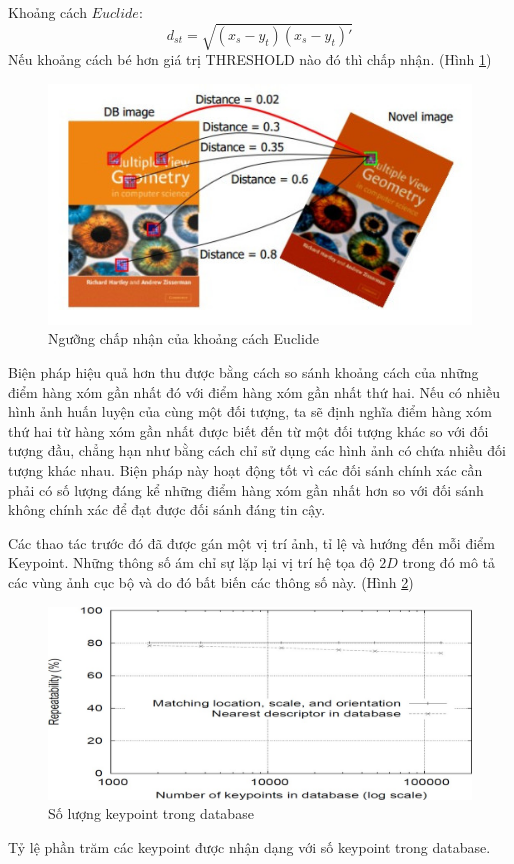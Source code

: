 \documentclass[conference]{IEEEtran}
\begin{document}
Khoảng cách $Euclide$:
\begin{equation}
d_{st} = \sqrt{(x_s - y_t)(x_s - y_t)'}
\end{equation}
Nếu khoảng cách bé hơn giá trị THRESHOLD nào đó 
thì chấp nhận. (Hình \ref{fig:khoangcach_nam})
\begin{figure}
  \includegraphics[width=\linewidth]{khoangcach_nam}
  \caption{Ngưỡng chấp nhận của khoảng cách Euclide}
  \label{fig:khoangcach_nam}
\end{figure}

Biện pháp hiệu quả hơn thu được bằng cách so sánh khoảng cách của những điểm hàng xóm gần nhất đó với điểm hàng xóm gần nhất thứ hai. Nếu có nhiều hình ảnh huấn luyện của cùng một đối tượng, ta sẽ định nghĩa điểm hàng xóm thứ hai từ hàng xóm gần nhất được biết đến từ một đối tượng khác so với đối tượng đầu, chẳng hạn như bằng cách chỉ sử dụng các hình ảnh có chứa nhiều đối tượng khác nhau. Biện pháp này hoạt động tốt vì các đối sánh chính xác cần phải có số lượng đáng kể những điểm hàng xóm gần nhất hơn so với đối sánh không chính xác để đạt được đối sánh đáng tin cậy.

Các thao tác trước đó đã được gán một vị trí ảnh, tỉ lệ và hướng đến mỗi điểm Keypoint. Những thông số ám chỉ sự lặp lại vị trí hệ tọa độ $2D$ trong đó mô tả các vùng ảnh cục bộ và do đó bất biến các thông số này. (Hình \ref{fig:soluongkeypoint_nam})

\begin{figure}
  \includegraphics[width=\linewidth]{soluongkeypoint_nam}
  \caption{Số lượng keypoint trong database}
  \label{fig:soluongkeypoint_nam}
\end{figure}
Tỷ lệ phần trăm các keypoint được nhận dạng với số keypoint trong database.
\end{document}
